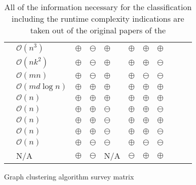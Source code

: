 \documentclass[12pt,a4paper]{report}
\begin{document}
\begin{table}[ht!]
\def\arraystretch{1.60}
\begin{tabularx}{\textwidth}{|Y||p{2.4cm}|Y|Y|Y|Y|Y|Y|Y|Y|Y|}
 \hline
  &  &  &  &  &  &  &  \\
 \hline\hline
 \cite{girvan2002community}     & \(\mathcal{O}(n^3)\)          & $\oplus$  & $\ominus$  & $\oplus$   & $\oplus$  & $\oplus$  & $\oplus$ \\\hline
 \cite{vandongen2000graph}      & \(\mathcal{O}(nk^2)\)         & $\oplus$  & $\ominus$  & $\oplus$   & $\oplus$  & $\oplus$  & $\ominus$ \\\hline
 \cite{pons2005computing}       & \(\mathcal{O}(mn)\)           & $\oplus$  & $\ominus$  & $\oplus$   & $\oplus$  & $\ominus$ & $\ominus$ \\\hline
 \cite{clauset2004modularity}   & \(\mathcal{O}(md \log{n})\)   & $\oplus$  & $\oplus$   & $\oplus$   & $\oplus$  & $\oplus$  & $\oplus$ \\\hline
 \cite{blondel2008modularity}   & \(\mathcal{O}(n)\)            & $\oplus$  & $\oplus$   & $\oplus$   & $\oplus$  & $\oplus$  & $\oplus$ \\\hline
 \cite{raghavan2007lpa}         & \(\mathcal{O}(n)\)            & $\oplus$  & $\oplus$   & $\ominus$  & $\oplus$  & $\oplus$  & $\ominus$ \\\hline
 \cite{rosvall2008infomap}      & \(\mathcal{O}(n)\)            & $\oplus$  & $\oplus$   & $\ominus$  & $\oplus$  & $\oplus$  & $\oplus$ \\\hline
 \cite{biemann2006chinese}      & \(\mathcal{O}(n)\)            & $\oplus$  & $\oplus$   & $\ominus$  & $\oplus$  & $\oplus$  & $\ominus$ \\\hline
 \cite{reichardt2004detecting}  & \(\mathcal{O}(n)\)            & $\oplus$  & $\ominus$  & $\ominus$  & $\oplus$  & $\ominus$ & $\ominus$ \\\hline
 \cite{donetti2004detecting}    & N/A                           & $\oplus$  & $\ominus$  & N/A        & $\ominus$ & $\oplus$  & $\oplus$ \\\hline
\end{tabularx}
\caption{Graph clustering algorithm survey matrix}
\caption*{\centering
  All of the information necessary for the classification including the
  runtime complexity indications are taken out of the original papers of the
}
\end{table}
\end{document}
